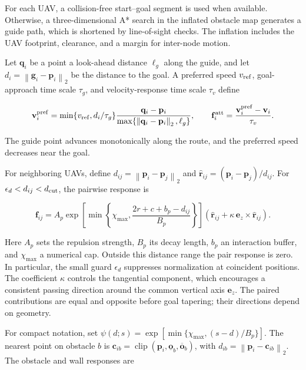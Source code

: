 \documentclass[electronics,article,submit,moreauthors]{Definitions/mdpi}
\newcommand{\norm}[1]{\left\lVert #1\right\rVert}
\newcommand{\bp}{\mathbf{p}}
\newcommand{\bv}{\mathbf{v}}
\DeclareMathOperator{\clip}{clip}
\begin{document}
For each UAV, a collision-free start--goal segment is used when available. Otherwise, a three-dimensional A* search in the inflated obstacle map generates a guide path, which is shortened by line-of-sight checks. The inflation includes the UAV footprint, clearance, and a margin for inter-node motion.

Let $\mathbf q_i$ be a point a look-ahead distance $\ell_g$ along the guide, and let $d_i=\norm{\mathbf g_i-\bp_i}_2$ be the distance to the goal. A preferred speed $v_{\rm ref}$, goal-approach time scale $\tau_g$, and velocity-response time scale $\tau_v$ define

\begin{equation}
 \bv_i^{\rm pref}=\min\{v_{\rm ref},d_i/\tau_g\}
 \frac{\mathbf q_i-\bp_i}{\max\{\norm{\mathbf q_i-\bp_i}_2,\ell_g\}},
 \qquad \mathbf f_i^{\rm att}=\frac{\bv_i^{\rm pref}-\bv_i}{\tau_v}.
 \label{eq:attraction}
\end{equation}

The guide point advances monotonically along the route, and the preferred speed decreases near the goal.

For neighboring UAVs, define $d_{ij}=\norm{\bp_i-\bp_j}_2$ and $\widehat{\mathbf r}_{ij}=(\bp_i-\bp_j)/d_{ij}$. For $\epsilon_d<d_{ij}<d_{\rm cut}$, the pairwise response is

\begin{equation}
 \mathbf f_{ij}=A_p\exp\!\left[
 \min\left\{\chi_{\max},\frac{2r+c+b_p-d_{ij}}{B_p}\right\}\right]
 \left(\widehat{\mathbf r}_{ij}+\kappa\,\mathbf e_z\times\widehat{\mathbf r}_{ij}\right).
 \label{eq:repulsion}
\end{equation}

Here $A_p$ sets the repulsion strength, $B_p$ its decay length, $b_p$ an interaction buffer, and $\chi_{\max}$ a numerical cap. Outside this distance range the pair response is zero. In particular, the small guard $\epsilon_d$ suppresses normalization at coincident positions. The coefficient $\kappa$ controls the tangential component, which encourages a consistent passing direction around the common vertical axis $\mathbf e_z$. The paired contributions are equal and opposite before goal tapering; their directions depend on geometry.

For compact notation, set $\psi(d;s)=\exp[\min\{\chi_{\max},(s-d)/B_p\}]$. The nearest point on obstacle $b$ is $\mathbf c_{ib}=\clip(\bp_i,\underline{\mathbf o}_b,\overline{\mathbf o}_b)$, with $d_{ib}=\norm{\bp_i-\mathbf c_{ib}}_2$. The obstacle and wall responses are
\end{document}
